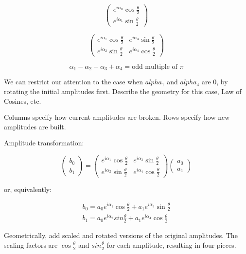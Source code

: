 \documentclass[11pt, letterpaper]{article}
\begin{document}
{\begin{equation}
	\begin{pmatrix} e^{i\alpha_0}\cos\frac{\theta}{2}  \\  e^{i\alpha_1}\sin\frac{\theta}{2} \end{pmatrix}
\end{equation}

\begin{equation}
	\begin{pmatrix} e^{i\alpha_1}\cos\frac{\theta}{2} & e^{i\alpha_3}\sin\frac{\theta}{2}\\  e^{i\alpha_2}\sin\frac{\theta}{2} &  e^{i\alpha_4}\cos\frac{\theta}{2} \end{pmatrix}
\end{equation}

$$\alpha_1 - \alpha_2  - \alpha_3  + \alpha_4 = \text{odd multiple of }\pi$$

We can restrict our attention to the case when  $alpha_1$ and $alpha_4$ are $0$, by rotating the initial amplitudes first. Describe the geometry for this case, Law of Cosines, etc.

Columns specify how current amplitudes are broken. Rows specify how new amplitudes are built.

Amplitude transformation:

\begin{equation}
	\begin{pmatrix}b_0 \\ b_1 \end{pmatrix} =
		\begin{pmatrix} e^{i\alpha_1}\cos\frac{\theta}{2} & e^{i\alpha_3}\sin\frac{\theta}{2}\\  e^{i\alpha_2}\sin\frac{\theta}{2} &  e^{i\alpha_4}\cos\frac{\theta}{2} \end{pmatrix}
	\begin{pmatrix} a_0 \\ a_1 \end{pmatrix}
\end{equation}

or, equivalently:

\begin{eqnarray*}
	b_0 = a_0e^{i\alpha_1}\cos\frac{\theta}{2}  +  a_1e^{i\alpha_3}\sin\frac{\theta}{2} \\
	b_1 = a_0e^{i\alpha_2}sin\frac{\theta}{2} + a_1e^{i\alpha_4}\cos\frac{\theta}{2}
\end{eqnarray*}


Geometrically, add scaled and rotated versions of the original amplitudes. The scaling factors are  $\cos\frac{\theta}{2}$ and $sin\frac{\theta}{2}$ for each amplitude, resulting in four pieces.

}
\end{document}
